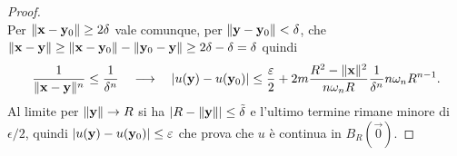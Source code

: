 \begin{proof}
\begin{equation}
    \end{equation}
    Per $\lVert\mathbf{x}-\mathbf{y}_0\rVert\ge 2\delta$ vale comunque, per $\lVert\mathbf{y}-\mathbf{y}_0\rVert<\delta$, che $\lVert\mathbf{x}-\mathbf{y}\rVert\ge\lVert\mathbf{x}-\mathbf{y}_0\rVert-\lVert\mathbf{y}_0-\mathbf{y}\rVert\ge 2\delta-\delta=\delta$ quindi
    \begin{equation}
        \frac1{\lVert\mathbf{x}-\mathbf{y}\rVert^n}\le\frac1{\delta^n}
        \quad\longrightarrow\quad
        \lvert u(\mathbf{y})-u(\mathbf{y}_0)\rvert\le
        \frac{\varepsilon}2+2m\frac{R^2-\lVert\mathbf{x}\rVert^2}{n\omega_n R}\frac1{\delta^n}n\omega_n R^{n-1}.
    \end{equation}
    Al limite per $\lVert\mathbf{y}\rVert\to R$ si ha $\lvert R-\lVert\mathbf{y}\rVert\rvert\le\tilde{\delta}$ e l'ultimo termine rimane minore di $\epsilon/2$, quindi $\lvert u(\mathbf{y})-u(\mathbf{y}_0)\rvert\le\varepsilon$ che prova che $u$ è continua in $B_R(\vec 0)$.
\end{proof}

